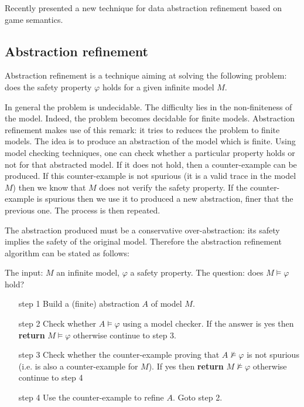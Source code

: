 Recently \citeauthor{DBLP:conf/sas/DimovskiGL05} presented
\citep{DBLP:conf/sas/DimovskiGL05} a new technique for data
abstraction refinement based on game semantics.

\subsection{Abstraction refinement}

Abstraction refinement is a technique aiming at solving the
following problem: does the safety property $\varphi$ holds for a
given infinite model $M$.

In general the problem is undecidable. The difficulty lies in the
non-finiteness of the model. Indeed, the problem becomes decidable
for finite models. Abstraction refinement makes use of this remark:
it tries to reduces the problem to finite models. The idea is to
produce an abstraction of the model which is finite. Using model
checking techniques, one can check whether a particular property
holds or not for that abstracted model. If it does not hold, then a
counter-example can be produced. If this counter-example is not
spurious (it is a valid trace in the model $M$) then we know that
$M$ does not verify the safety property. If the counter-example is
spurious then we use it to produced a new abstraction, finer that
the previous one. The process is then repeated.

The abstraction produced must be a conservative over-abstraction:
its safety implies the safety of the original model. Therefore the
abstraction refinement algorithm can be stated as follows:

\begin{algo}
The input: $M$ an infinite model, $\varphi$ a safety property. The
question: does $M \models \varphi$ hold?
\begin{enumerate}
\item[step 1] Build a (finite) abstraction $A$ of model $M$.
\item[step 2] Check whether $A \models \varphi$ using a model
checker. If the answer is yes then \textbf{return} $M \models
\varphi$ otherwise continue to step 3.

\item[step 3] Check whether the counter-example proving that $A \not \models
\varphi$ is not spurious (i.e. is also a counter-example for $M$).
If yes then \textbf{return} $M \not\models \varphi$ otherwise
continue to step 4

\item[step 4] Use the counter-example to refine $A$. Goto step 2.
\end{enumerate}
\end{algo}

